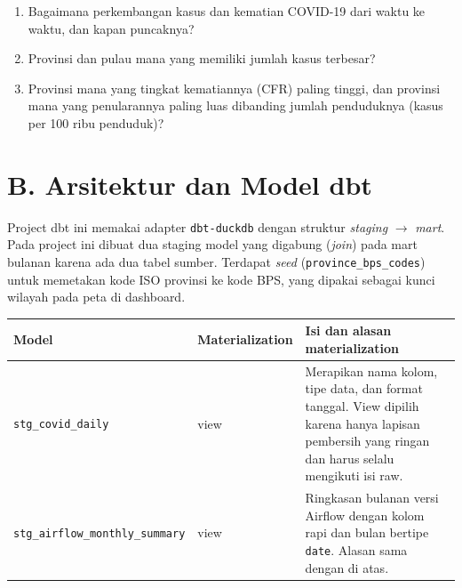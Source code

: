 \documentclass[11pt]{article}
\begin{document}
\begin{enumerate}[nosep, label=\textbf{Q\arabic*.}]
    \item Bagaimana perkembangan kasus dan kematian COVID-19 dari waktu ke waktu, dan kapan puncaknya?
    \item Provinsi dan pulau mana yang memiliki jumlah kasus terbesar?
    \item Provinsi mana yang tingkat kematiannya (CFR) paling tinggi, dan provinsi mana yang penularannya paling luas dibanding jumlah penduduknya (kasus per 100 ribu penduduk)?
\end{enumerate}

\section*{B. Arsitektur dan Model dbt}

Project dbt ini memakai adapter \texttt{dbt-duckdb} dengan struktur
\textit{staging} $\rightarrow$ \textit{mart}.
Pada project ini dibuat dua staging model yang digabung (\textit{join}) pada mart bulanan karena ada dua tabel sumber.
Terdapat \textit{seed} (\texttt{province\_bps\_codes}) untuk memetakan kode ISO provinsi
ke kode BPS, yang dipakai sebagai kunci wilayah pada peta di dashboard.

\begin{center}
\begin{minipage}{\linewidth}\centering\small
{}
\begin{tabular}{@{}p{4.7cm} l p{8.0cm}@{}}
\toprule
\textbf{Model} & \textbf{Materialization} & \textbf{Isi dan alasan materialization} \\
\midrule
\texttt{stg\_covid\_daily} & view & Merapikan nama kolom, tipe data, dan format tanggal. View dipilih karena hanya lapisan pembersih yang ringan dan harus selalu mengikuti isi raw. \\
\texttt{stg\_airflow\_monthly\_summary} & view & Ringkasan bulanan versi Airflow dengan kolom rapi dan bulan bertipe \texttt{date}. Alasan sama dengan di atas. \\
\bottomrule
\end{tabular}
\end{minipage}
\end{center}
\end{document}
